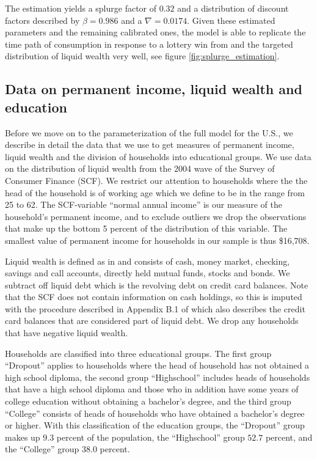 \documentclass[../HAFiscal]{subfiles}
\begin{document}
The estimation yields a splurge factor of $0.32$ and a distribution of discount factors described by $\beta = 0.986$ and a $\nabla=0.0174$. Given these estimated parameters and the remaining calibrated ones, the model is able to replicate the time path of consumption in response to a lottery win from \citet{fagereng_mpc_2021} and the targeted distribution of liquid wealth very well, see figure \ref{fig:splurge_estimation}.


\subsection{Data on permanent income, liquid wealth and education}
\label{sec:SCFdata}

Before we move on to the parameterization of the full model for the U.S., we describe in detail the data that we use to get measures of permanent income, liquid wealth and the division of households into educational groups. We use data on the distribution of liquid wealth from the 2004 wave of the Survey of Consumer Finance (SCF). We restrict our attention to households where the the head of the household is of working age which we define to be in the range from 25 to 62. The SCF-variable ``normal annual income'' is our measure of the household's permanent income, and to exclude outliers we drop the observations that make up the bottom 5 percent of the distribution of this variable. The smallest value of permanent income for households in our sample is thus \$16,708. 

Liquid wealth is defined as in \citet{kaplan2014model} and consists of cash, money market, checking, savings and call accounts, directly held mutual funds, stocks and bonds. We subtract off liquid debt which is the revolving debt on credit card balances. Note that the SCF does not contain information on cash holdings, so this is imputed with the procedure described in Appendix B.1 of \citet{kaplan2014model} which also describes the credit card balances that are considered part of liquid debt. We drop any households that have negative liquid wealth. 

Households are classified into three educational groups. The first group ``Dropout'' applies to households where the head of household has not obtained a high school diploma, the second group ``Highschool'' includes heads of households that have a high school diploma and those who in addition have some years of college education without obtaining a bachelor's degree, and the third group ``College'' consists of heads of households who have obtained a bachelor's degree or higher. With this classification of the education groups, the ``Dropout'' group makes up $9.3$ percent of the population, the ``Highschool'' group $52.7$ percent, and the ``College'' group $38.0$ percent. 
\end{document}
